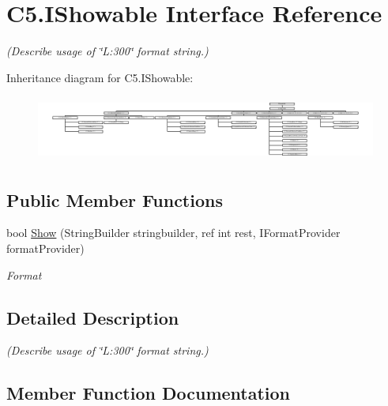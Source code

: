 \hypertarget{interface_c5_1_1_i_showable}{}\section{C5.\+I\+Showable Interface Reference}
\label{interface_c5_1_1_i_showable}


{\itshape (Describe usage of \char`\"{}\+L\+:300\char`\"{} format string.)}  


Inheritance diagram for C5.\+I\+Showable\+:\begin{figure}[H]
\begin{center}
\leavevmode
\includegraphics[height=2.178988cm]{interface_c5_1_1_i_showable}
\end{center}
\end{figure}
\subsection*{Public Member Functions}
\begin{DoxyCompactItemize}
\item 
bool \hyperlink{interface_c5_1_1_i_showable_a0605b632e204023f0b32b2aec8e6ad27}{Show} (String\+Builder stringbuilder, ref int rest, I\+Format\+Provider format\+Provider)
\begin{DoxyCompactList}\small\item\em Format \end{DoxyCompactList}\end{DoxyCompactItemize}


\subsection{Detailed Description}
{\itshape (Describe usage of \char`\"{}\+L\+:300\char`\"{} format string.)} 



\subsection{Member Function Documentation}
\hypertarget{interface_c5_1_1_i_showable_a0605b632e204023f0b32b2aec8e6ad27}{}
